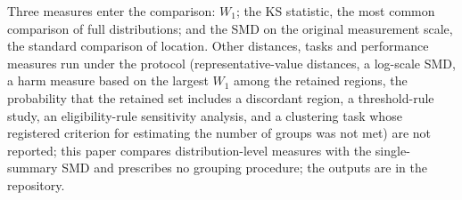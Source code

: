 \documentclass[AMA,Times1COL]{WileyNJDv5}
\begin{document}

Three measures enter the comparison: $W_1$; the KS statistic, the most common comparison of full distributions; and the SMD on the original measurement scale, the standard comparison of location. %
Other distances, tasks and performance measures run under the protocol (representative-value distances, a log-scale SMD, a harm measure based on the largest $W_1$ among the retained regions, the probability that the retained set includes a discordant region, a threshold-rule study, an eligibility-rule sensitivity analysis, and a clustering task whose registered criterion for estimating the number of groups was not met) are not reported; this paper compares distribution-level measures with the single-summary SMD and prescribes no grouping procedure; the outputs are in the repository.
\end{document}
